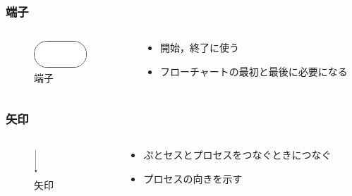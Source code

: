 \documentclass[10pt, dvipdfmx]{beamer}
\begin{document}
        \begin{frame}
            \frametitle{端子}
            \begin{columns}[c]
                \begin{column}{0.50\textwidth}
                    \begin{figure}[htb]
                        \includegraphics[height=10mm]{images/terminal.jpg}
                        \caption{端子}
                        \label{fig:05}
                    \end{figure}
                \end{column}
                \begin{column}{0.50\textwidth}
                    \begin{block}{}
                        \begin{itemize}
                            \item 開始，終了に使う
                            \item フローチャートの最初と最後に必要になる
                        \end{itemize}
                    \end{block}
                \end{column}
            \end{columns}
        \end{frame}

        \begin{frame}
            \frametitle{矢印}
            \begin{columns}[c]
                \begin{column}{0.50\textwidth}
                    \begin{figure}[htb]
                        \includegraphics[height=10mm]{images/arrow.jpg}
                        \caption{矢印}
                        \label{fig:06}
                    \end{figure}
                \end{column}
                \begin{column}{0.50\textwidth}
                    \begin{block}{}
                        \begin{itemize}
                            \item ぷとセスとプロセスをつなぐときにつなぐ
                            \item プロセスの向きを示す
                        \end{itemize}
                    \end{block}
                \end{column}
            \end{columns}
        \end{frame}
\end{document}
